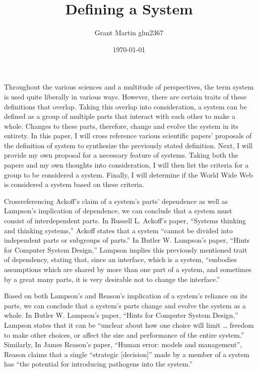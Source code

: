 \documentclass[11pt]{article}
\title{Defining a System}
\author{Grant Martin glm2367}
\date{\today}
\begin{document}
\maketitle

Throughout the various sciences and a multitude of perspectives, the term system is used quite liberally in various ways. However, there are certain traits of these definitions that overlap. Taking this overlap into consideration, a system can be defined as a group of multiple parts that interact with each other to make a whole. Changes to these parts, therefore, change and evolve the system in its entirety. In this paper, I will cross reference various scientific papers' proposals of the definition of system to synthesize the previously stated definition. Next, I will provide my own proposal for a necessary feature of systems. Taking both the papers and my own thoughts into consideration, I will then list the criteria for a group to be considered a system. Finally, I will determine if the World Wide Web is considered a system based on these criteria.
\par Crossreferencing Ackoff's claim of a system's parts' dependence as well as Lampson's implication of dependence, we can conclude that a system must consist of interdependent parts. In Russell  L.  Ackoff's paper, ``Systems thinking and thinking systems,'' Ackoff states that a system ``cannot be divided  into  independent  parts  or subgroups  of parts.''\cite{ackoff:1994} In Butler W. Lampson's paper, ``Hints for Computer System Design,'' Lampson implies this previously mentioned trait of dependency, stating that, since an interface, which is a system, ``embodies assumptions which are shared by more than one part of a system, and sometimes by a great many parts, it is very desirable not to change the interface.''\cite{lampson:1983} 
\par Based on both Lampson's and Reason's implication of a system's reliance on its parts, we can conclude that a system's parts change and evolve the system as a whole. In Butler W. Lampson's paper, ``Hints for Computer System Design,'' Lampson states that it can be ``unclear about how one choice will limit … freedom to make other choices, or affect the size and performance of the entire system.''\cite{lampson:1983} Similarly, In James  Reason's paper, ``Human error: models and management'', Reason claims that a single ``strategic [decision]'' made by a member of a system has ``the potential   for   introducing   pathogens   into   the system.''\cite{reason:2000}
\end{document}

